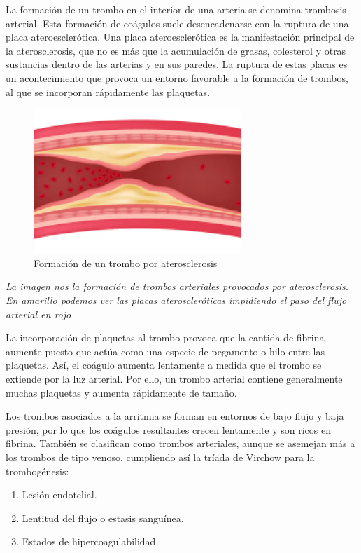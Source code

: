 
La formación de un trombo en el interior de una arteria se denomina trombosis arterial. Esta formación de coágulos suele desencadenarse con la ruptura de una placa ateroesclerótica. Una placa ateroesclerótica es la manifestación principal de la aterosclerosis, que no es más que la acumulación de grasas, colesterol y otras sustancias dentro de las arterias y en sus paredes. La ruptura de estas placas es un acontecimiento que provoca un entorno favorable a la formación de trombos, al que se incorporan rápidamente las plaquetas.

\begin{figure}[h]
    \centering
	\includegraphics[width=0.70\textwidth]{figures/aterosclerosis.png}
	\caption{Formación de un trombo por aterosclerosis}
	\label{fig:example1}
  \end{figure}
  \textit{La imagen nos la formación de trombos arteriales provocados por aterosclerosis. En amarillo podemos ver las placas ateroscleróticas impidiendo el paso del flujo arterial en rojo}
  
La incorporación de plaquetas al trombo provoca que la cantida de fibrina aumente puesto que actúa como una especie de pegamento o hilo entre las plaquetas. Así, el coágulo aumenta lentamente a medida que el trombo se extiende por la luz arterial. Por ello, un trombo arterial contiene generalmente muchas plaquetas y aumenta rápidamente de tamaño.

Los trombos asociados a la arritmia se forman en entornos de bajo flujo y baja presión, por lo que los coágulos resultantes crecen lentamente y son ricos en fibrina. También se clasifican como trombos arteriales, aunque se asemejan más a los trombos de tipo venoso, cumpliendo así la tríada de Virchow para la trombogénesis:
        \begin{enumerate}
          \item Lesión endotelial.
          \item Lentitud del flujo o estasis sanguínea.
          \item Estados de hipercoagulabilidad.
         \end{enumerate}

